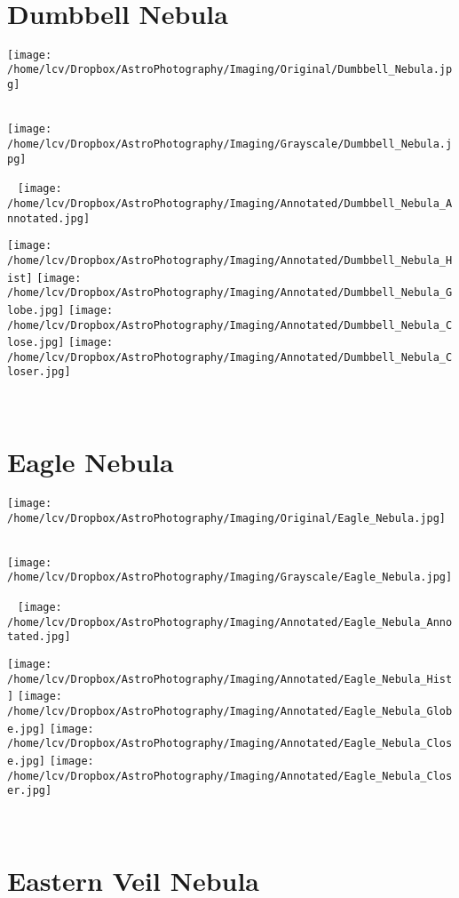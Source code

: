 \ \\\section{Dumbbell Nebula}
\texttt{[image: /home/lcv/Dropbox/AstroPhotography/Imaging/Original/Dumbbell\_Nebula.jpg]}
{\footnotesize\color{white}


}\ \\
\texttt{[image: /home/lcv/Dropbox/AstroPhotography/Imaging/Grayscale/Dumbbell\_Nebula.jpg]}
\begin{center}
 \ \newpage
\texttt{[image: /home/lcv/Dropbox/AstroPhotography/Imaging/Annotated/Dumbbell\_Nebula\_Annotated.jpg]}

\texttt{[image: /home/lcv/Dropbox/AstroPhotography/Imaging/Annotated/Dumbbell\_Nebula\_Hist]}
\texttt{[image: /home/lcv/Dropbox/AstroPhotography/Imaging/Annotated/Dumbbell\_Nebula\_Globe.jpg]}
\texttt{[image: /home/lcv/Dropbox/AstroPhotography/Imaging/Annotated/Dumbbell\_Nebula\_Close.jpg]}
\texttt{[image: /home/lcv/Dropbox/AstroPhotography/Imaging/Annotated/Dumbbell\_Nebula\_Closer.jpg]}
\end{center}
\ \\\section{Eagle Nebula}
\texttt{[image: /home/lcv/Dropbox/AstroPhotography/Imaging/Original/Eagle\_Nebula.jpg]}
{\footnotesize\color{white}


}\ \\
\texttt{[image: /home/lcv/Dropbox/AstroPhotography/Imaging/Grayscale/Eagle\_Nebula.jpg]}
\begin{center}
 \ \newpage
\texttt{[image: /home/lcv/Dropbox/AstroPhotography/Imaging/Annotated/Eagle\_Nebula\_Annotated.jpg]}

\texttt{[image: /home/lcv/Dropbox/AstroPhotography/Imaging/Annotated/Eagle\_Nebula\_Hist]}
\texttt{[image: /home/lcv/Dropbox/AstroPhotography/Imaging/Annotated/Eagle\_Nebula\_Globe.jpg]}
\texttt{[image: /home/lcv/Dropbox/AstroPhotography/Imaging/Annotated/Eagle\_Nebula\_Close.jpg]}
\texttt{[image: /home/lcv/Dropbox/AstroPhotography/Imaging/Annotated/Eagle\_Nebula\_Closer.jpg]}
\end{center}
\ \\\section{Eastern Veil Nebula}
